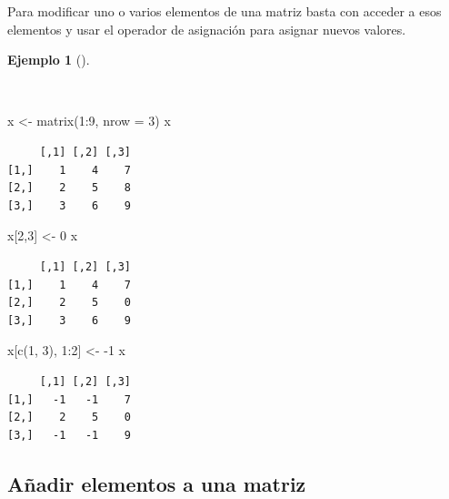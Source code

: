 \documentclass[
  a4paper,
]{scrreport}
\newenvironment{Shaded}{\begin{snugshade}}{\end{snugshade}}
\newcommand{\AttributeTok}[1]{\textcolor[rgb]{0.40,0.45,0.13}{#1}}
\newcommand{\DecValTok}[1]{\textcolor[rgb]{0.68,0.00,0.00}{#1}}
\newcommand{\FunctionTok}[1]{\textcolor[rgb]{0.28,0.35,0.67}{#1}}
\newcommand{\NormalTok}[1]{\textcolor[rgb]{0.00,0.23,0.31}{#1}}
\newcommand{\OtherTok}[1]{\textcolor[rgb]{0.00,0.23,0.31}{#1}}
\newcommand{\SpecialCharTok}[1]{\textcolor[rgb]{0.37,0.37,0.37}{#1}}
\theoremstyle{definition}
\theoremstyle{definition}
\newtheorem{example}{Ejemplo}[chapter]
\theoremstyle{remark}
\begin{document}
Para modificar uno o varios elementos de una matriz basta con acceder a
esos elementos y usar el operador de asignación para asignar nuevos
valores.

\begin{example}[]\protect\hypertarget{exm-modificacion-matriz}{}\label{exm-modificacion-matriz}

~

\begin{Shaded}
\begin{Highlighting}[]
\NormalTok{x }\OtherTok{\textless{}{-}} \FunctionTok{matrix}\NormalTok{(}\DecValTok{1}\SpecialCharTok{:}\DecValTok{9}\NormalTok{, }\AttributeTok{nrow =} \DecValTok{3}\NormalTok{)}
\NormalTok{x}
\end{Highlighting}
\end{Shaded}

\begin{verbatim}
     [,1] [,2] [,3]
[1,]    1    4    7
[2,]    2    5    8
[3,]    3    6    9
\end{verbatim}

\begin{Shaded}
\begin{Highlighting}[]
\NormalTok{x[}\DecValTok{2}\NormalTok{,}\DecValTok{3}\NormalTok{] }\OtherTok{\textless{}{-}} \DecValTok{0}
\NormalTok{x}
\end{Highlighting}
\end{Shaded}

\begin{verbatim}
     [,1] [,2] [,3]
[1,]    1    4    7
[2,]    2    5    0
[3,]    3    6    9
\end{verbatim}

\begin{Shaded}
\begin{Highlighting}[]
\NormalTok{x[}\FunctionTok{c}\NormalTok{(}\DecValTok{1}\NormalTok{, }\DecValTok{3}\NormalTok{), }\DecValTok{1}\SpecialCharTok{:}\DecValTok{2}\NormalTok{] }\OtherTok{\textless{}{-}} \SpecialCharTok{{-}}\DecValTok{1}
\NormalTok{x}
\end{Highlighting}
\end{Shaded}

\begin{verbatim}
     [,1] [,2] [,3]
[1,]   -1   -1    7
[2,]    2    5    0
[3,]   -1   -1    9
\end{verbatim}

\end{example}

\hypertarget{auxf1adir-elementos-a-una-matriz}{%
\subsection{Añadir elementos a una
matriz}\label{auxf1adir-elementos-a-una-matriz}}
\end{document}

